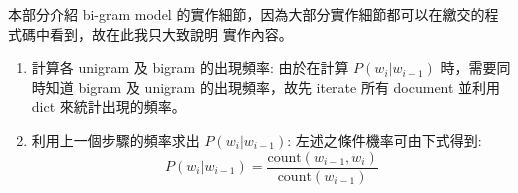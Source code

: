 \documentclass{article}[12pt]
\begin{document}
本部分介紹 bi-gram model 的實作細節，因為大部分實作細節都可以在繳交的程式碼中看到，故在此我只大致說明
實作內容。

\begin{enumerate}
    \item 計算各 unigram 及 bigram 的出現頻率: 由於在計算 $P(w_i|w_{i-1})$ 時，需要同時知道 bigram 及
    unigram 的出現頻率，故先 iterate 所有 document 並利用 dict 來統計出現的頻率。
    \item 利用上一個步驟的頻率求出 $P(w_i|w_{i-1})$: 左述之條件機率可由下式得到:
    \begin{equation}
        P(w_i|w_{i-1}) = \frac{\text{count}(w_{i-1}, w_i)}{\text{count}(w_{i-1})}
    \end{equation}
\end{enumerate}
\end{document}
